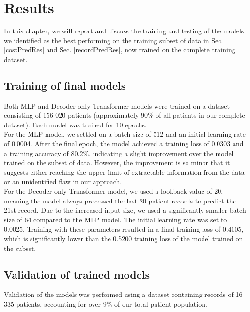 
\chapter{Results} \label{chap:results}

In this chapter, we will report and discuss the training and testing of the models we identified as the best performing on the training subset of data in Sec. \ref{costPredRes} and Sec. \ref{recordPredRes}, now trained on the complete training dataset.
\\

\section{Training of final models}
\label{modelTrain}

Both MLP and Decoder-only Transformer models were trained on a dataset consisting of 156 020 patients (approximately 90\% of all patients in our complete dataset). Each model was trained for 10 epochs.
\\

For the MLP model, we settled on a batch size of 512 and an initial learning rate of 0.0004. After the final epoch, the model achieved a training loss of 0.0303 and a training accuracy of 80.2\%, indicating a slight improvement over the model trained on the subset of data. However, the improvement is so minor that it suggests either reaching the upper limit of extractable information from the data or an unidentified flaw in our approach.
\\

For the Decoder-only Transformer model, we used a lookback value of 20, meaning the model always processed the last 20 patient records to predict the 21st record. Due to the increased input size, we used a significantly smaller batch size of 64 compared to the MLP model. The initial learning rate was set to 0.0025. Training with these parameters resulted in a final training loss of 0.4005, which is significantly lower than the 0.5200 training loss of the model trained on the subset.

\section{Validation of trained models}
\label{modelValid}

Validation of the models was performed using a dataset containing records of 16 335 patients, accounting for over 9\% of our total patient population.
\\

